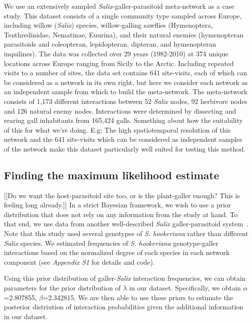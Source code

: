 \documentclass[12pt]{article}
\begin{document}
      We use an extensively sampled \emph{Salix}-galler-parasitoid meta-network as a case study. This dataset consists of a single community type sampled across Europe, including willow (\emph{Salix}) species, willow-galling sawflies (Hymenoptera, Tenthredinidae, Nematinae, Euurina), and their natural enemies (hymenopteran parasitoids and coleopteran, lepidopteran, dipteran, and hymenopteran inquilines). The data was collected over 29 years (1982-2010) at 374 unique locations across Europe ranging from Sicily to the Arctic. Including repeated visits to a number of sites, the data set contains 641 site-visits, each of which can be considered as a network in its own right, but here we consider each network as an independent sample from which to build the meta-network. The meta-network consists of 1,173 different interactions between 52 \emph{Salix} nodes, 92 herbivore nodes and 126 natural enemy nodes. Interactions were determined by dissecting and rearing gall inhabitants from 165,424 galls. Something about how the suitability of this for what we're doing. E.g: The high spatiotemporal resolution of this network and the 641 site-visits which can be considered as independent samples of the network make this dataset particularly well suited for testing this method.


    \subsection*{Finding the maximum likelihood estimate}

      [[Do we want the host-parasitoid site too, or is the plant-galler enough? This is feeling long already.]]
      In a strict Bayesian framework, we wish to use a prior distribution that does not rely on any information from the study at hand. To that end, we use data from another well-described \emph{Salix} galler-parasitoid system~\citep{Barbour2016,Barbour2016Dryad}. Note that this study used several genotypes of \emph{S. hookeriana} rather than different \emph{Salix} species. We estimated frequencies of  \emph{S. hookeriana} genotype-galler interactions based on the normalized degree of each species in each network component (see \emph{Appendix S1} for details and code).


      Using this prior distribution of galler-\emph{Salix} interaction frequencies, we can obtain parameters for the prior distribution of $\lambda$ in our dataset. Specifically, we obtain $\alpha$=2.807855, $\beta$=2.342815. We are then able to use these priors to estimate the posterior distriution of interaction probabilities given the additional information in our dataset.
\end{document}
